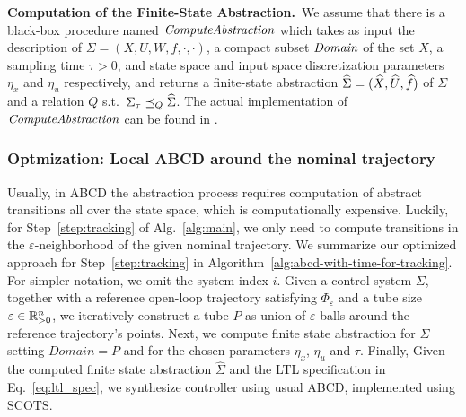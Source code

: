 \smallskip
\noindent\textbf{Computation of the Finite-State Abstraction.}\
We assume that there is a black-box procedure named $\mathit{ComputeAbstraction}$ which takes as input the description of $\Sigma = (X,U,W,f,\cdot,\cdot)$, a compact subset $\mathit{Domain}$ of the set $X$, a sampling time $\tau>0$, and state space and input space discretization parameters $\eta_x$ and $\eta_u$ respectively, and returns a finite-state abstraction $\widehat{\Sigma} = (\widehat{X},\widehat{U},\widehat{f})$ of $\Sigma$ and a relation $Q$ s.t.\ $\Sigma_\tau \preceq_{Q} \widehat{\Sigma}$.
The actual implementation of $\mathit{ComputeAbstraction}$ can be found in \cite{reissig2016feedback}.








\subsubsection{Optmization: Local ABCD around the nominal trajectory}\hfill

Usually, in ABCD the abstraction process requires computation of abstract transitions all over the state space, which is computationally expensive.
Luckily, for Step~\ref{step:tracking} of Alg.~\ref{alg:main}, we only need to compute transitions in the $\varepsilon$-neighborhood of the given nominal trajectory.
We summarize our optimized approach for Step~\ref{step:tracking} in Algorithm~\ref{alg:abcd-with-time-for-tracking}.
For simpler notation, we omit the system index $i$.
Given a control system $\Sigma$, together with a reference open-loop trajectory satisfying $\Phi_\varepsilon$ and a tube size $\varepsilon\in \mathbb{R}_{>0}^n$, we iteratively construct a tube $P$ as union of $\varepsilon$-balls around the reference trajectory's points. 
Next, we compute finite state abstraction for $\Sigma$ setting $Domain=P$ and for the chosen parameters $\eta_x$, $\eta_u$ and $\tau$. 
Finally, Given the computed finite state abstraction $\widehat \Sigma$ and the LTL specification in Eq.~\eqref{eq:ltl_spec}, we synthesize controller using usual ABCD, implemented using SCOTS. %



